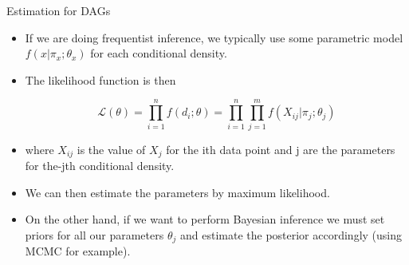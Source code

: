 \documentclass[handout]{beamer}
\begin{document}
\begin{frame}{Estimation for DAGs}
\scriptsize{
\begin{itemize}

\item If we are doing frequentist inference, we typically use some parametric model $f(x|\pi_x;\theta_x)$ for each conditional density. 

\item The likelihood function is then

\begin{displaymath}
 \mathcal{L}(\theta) = \prod_{i=1}^nf(d_i;\theta) =  \prod_{i=1}^n\prod_{j=1}^mf(X_{ij}|\pi_j;\theta_j)
\end{displaymath}

\item where $X_{ij}$ is the value of $X_j$ for the ith data point and j are the parameters for the-jth conditional density. 

\item We can then estimate the parameters by maximum likelihood.

\item On the other hand, if we want to perform Bayesian inference we must set priors for all our parameters $\theta_j$ and estimate the posterior accordingly (using MCMC for example).

 
\end{itemize}



} 

\end{frame}
\end{document}
